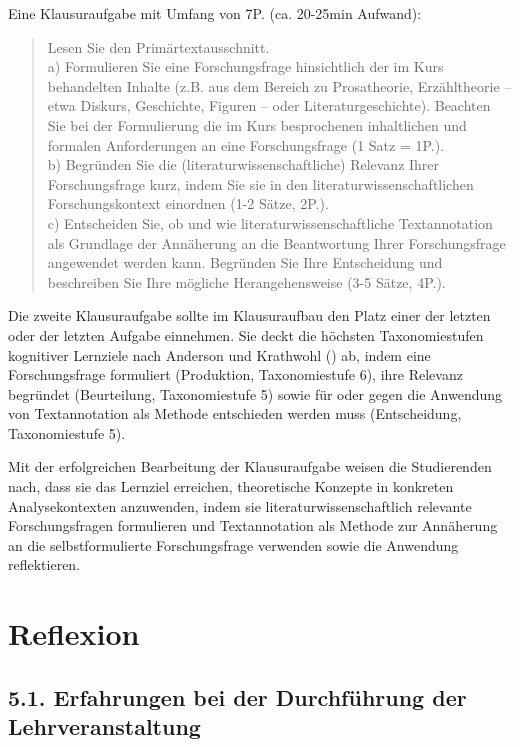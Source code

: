 \documentclass[
          a4paper,
        ]{article}
\begin{document}
Eine Klausuraufgabe mit Umfang von 7P. (ca. 20-25min Aufwand):

\begin{quote}
Lesen Sie den Primärtextausschnitt.\\
a) Formulieren Sie eine Forschungsfrage hinsichtlich der im Kurs
behandelten Inhalte (z.B. aus dem Bereich zu Prosatheorie, Erzähltheorie
-- etwa Diskurs, Geschichte, Figuren -- oder Literaturgeschichte).
Beachten Sie bei der Formulierung die im Kurs besprochenen inhaltlichen
und formalen Anforderungen an eine Forschungsfrage (1 Satz = 1P.).\\
b) Begründen Sie die (literaturwissenschaftliche) Relevanz Ihrer
Forschungsfrage kurz, indem Sie sie in den literaturwissenschaftlichen
Forschungskontext einordnen (1-2 Sätze, 2P.).\\
c) Entscheiden Sie, ob und wie literaturwissenschaftliche Textannotation
als Grundlage der Annäherung an die Beantwortung Ihrer Forschungsfrage
angewendet werden kann. Begründen Sie Ihre Entscheidung und beschreiben
Sie Ihre mögliche Herangehensweise (3-5 Sätze, 4P.).
\end{quote}

Die zweite Klausuraufgabe sollte im Klausuraufbau den Platz einer der
letzten oder der letzten Aufgabe einnehmen. Sie deckt die höchsten
Taxonomiestufen kognitiver Lernziele nach Anderson und Krathwohl
() ab, indem eine
Forschungsfrage formuliert (Produktion, Taxonomiestufe 6), ihre Relevanz
begründet (Beurteilung, Taxonomiestufe 5) sowie für oder gegen die
Anwendung von Textannotation als Methode entschieden werden muss
(Entscheidung, Taxonomiestufe 5).

Mit der erfolgreichen Bearbeitung der Klausuraufgabe weisen die
Studierenden nach, dass sie das Lernziel erreichen, theoretische
Konzepte in konkreten Analysekontexten anzuwenden, indem sie
literaturwissenschaftlich relevante Forschungsfragen formulieren und
Textannotation als Methode zur Annäherung an die selbstformulierte
Forschungsfrage verwenden sowie die Anwendung reflektieren.

\section{Reflexion}\label{reflexion}

\subsection{5.1. Erfahrungen bei der Durchführung der
Lehrveranstaltung}\label{erfahrungen-bei-der-durchfuxfchrung-der-lehrveranstaltung}
\end{document}

